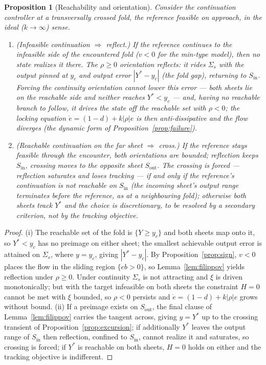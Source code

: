 \documentclass[11pt,american]{article}
\newtheorem{proposition}{Proposition}
\theoremstyle{definition}
\theoremstyle{plain}
\theoremstyle{remark}
\begin{document}
\begin{proposition}[Reachability and orientation]\label{prop:reach}
Consider the continuation controller at a transversally crossed fold, the reference feasible on approach, in the ideal ($k\to\infty$) sense.
\begin{enumerate}
\item[(i)] \emph{(Infeasible continuation $\Rightarrow$ reflect.)} If the reference continues to the infeasible side of the encountered fold ($v<0$ for the min-type model), then no state realizes it there. The $\rho\ge0$ orientation reflects: it rides $\Sigma_s$ with the output pinned at $y_c$ and output error $|Y^*-y_c|$ (the \emph{fold gap}), returning to $S_{\mathrm{in}}$. Forcing the continuity orientation cannot lower this error --- both sheets lie on the reachable side and neither reaches $Y^*<y_c$ --- and, having no reachable branch to follow, it drives the state off the reachable set with $\rho<0$; the locking equation $\dot e=(1-d)+k|\rho|e$ is then anti-dissipative and the flow diverges (the dynamic form of Proposition~\ref{prop:failure}).
\item[(ii)] \emph{(Reachable continuation on the far sheet $\Rightarrow$ cross.)} If the reference stays feasible through the encounter, both orientations are bounded; reflection keeps $S_{\mathrm{in}}$, crossing moves to the opposite sheet $S_{\mathrm{out}}$. The crossing is \emph{forced} --- reflection saturates and loses tracking --- if and only if the reference's continuation is not reachable on $S_{\mathrm{in}}$ (the incoming sheet's output range terminates before the reference, as at a neighbouring fold); otherwise both sheets track $Y^*$ and the choice is \emph{discretionary}, to be resolved by a secondary criterion, not by the tracking objective.
\end{enumerate}
\end{proposition}

\begin{proof}
(i) The reachable set of the fold is $\{Y\ge y_c\}$ and both sheets map onto it, so $Y^*<y_c$ has no preimage on either sheet; the smallest achievable output error is attained on $\Sigma_s$, where $y=y_c$, giving $|Y^*-y_c|$. By Proposition~\ref{prop:sign}, $v<0$ places the flow in the sliding region $\{eb>0\}$, so Lemma~\ref{lem:filippov} yields reflection under $\rho\ge0$. Under continuity $\Sigma_s$ is not attracting and $\xi$ is driven monotonically; but with the target infeasible on both sheets the constraint $H=0$ cannot be met with $\xi$ bounded, so $\rho<0$ persists and $\dot e=(1-d)+k|\rho|e$ grows without bound. (ii) If a preimage exists on $S_{\mathrm{out}}$, the final clause of Lemma~\ref{lem:filippov} carries the tangent across, giving $y=Y^*$ up to the crossing transient of Proposition~\ref{prop:excursion}; if additionally $Y^*$ leaves the output range of $S_{\mathrm{in}}$ then reflection, confined to $S_{\mathrm{in}}$, cannot realize it and saturates, so crossing is forced; if $Y^*$ is reachable on both sheets, $H=0$ holds on either and the tracking objective is indifferent.
\end{proof}
\end{document}
